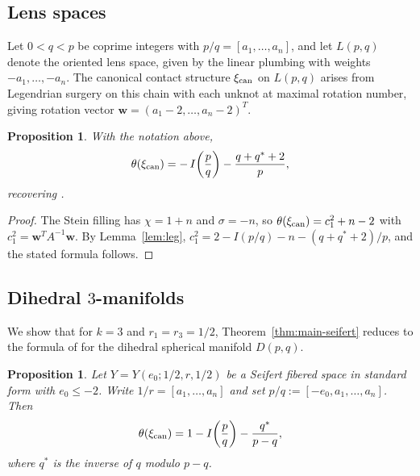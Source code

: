 \documentclass[11pt]{amsart}
\theoremstyle{plain}
\newtheorem{proposition}[theorem]{Proposition}
\theoremstyle{definition}
\theoremstyle{remark}
\begin{document}
\subsection{Lens spaces}
Let $0<q<p$ be coprime integers with $p/q=[a_1,\dots,a_n]$, and let
$L(p,q)$ denote the oriented lens space, given by the linear plumbing
with weights $-a_1,\dots,-a_n$. The canonical contact structure
$\xi_{\rm can}$ on $L(p,q)$ arises from Legendrian surgery on this
chain with each unknot at maximal rotation number, giving rotation
vector $\mathbf{w}=(a_1-2,\dots,a_n-2)^T$.

\begin{proposition}
With the notation above,
\[
\theta(\xi_{\rm can})
=
-\,I\!\left(\frac pq\right)-\frac{q+q^*+2}{p},
\]
recovering \cite[Prop.~9.3]{EtnyreOzbagciTosun2025}.
\end{proposition}

\begin{proof}
The Stein filling has $\chi=1+n$ and $\sigma=-n$, so
$\theta(\xi_{\rm can})=c_1^2+n-2$ with
$c_1^2=\mathbf{w}^TA^{-1}\mathbf{w}$. By Lemma~\ref{lem:leg},
$c_1^2=2-I(p/q)-n-(q+q^*+2)/p$, and the stated formula follows.
\end{proof}

\subsection{Dihedral $3$-manifolds}

We show that for $k=3$ and $r_1=r_3=1/2$, Theorem~\ref{thm:main-seifert}
reduces to the formula of \cite[Prop.~9.8]{EtnyreOzbagciTosun2025}
for the dihedral spherical manifold $D(p,q)$.

\begin{proposition}\label{prop:dihedral-eot}
Let $Y=Y(e_0;1/2,r,1/2)$ be a Seifert fibered space in standard form
with $e_0\le -2$. Write $1/r=[a_1,\dots,a_n]$ and set
$p/q:=[-e_0,a_1,\dots,a_n]$. Then
\[
\theta(\xi_{\rm can})
=
1-I\!\left(\frac{p}{q}\right)-\frac{q^*}{p-q},
\]
where $q^*$ is the inverse of $q$ modulo $p-q$.
\end{proposition}
\end{document}
